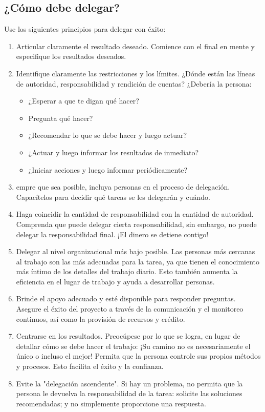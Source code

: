 \documentclass[10pt]{book}
\begin{document}
\subsection{¿Cómo debe delegar?}
Use los siguientes principios para delegar con éxito:
\begin{enumerate}[\bfseries 1.]
\item Articular claramente el resultado deseado. Comience con el final en mente y especifique los resultados deseados.
\item Identifique claramente las restricciones y los límites. ¿Dónde están las líneas de autoridad, responsabilidad y rendición de cuentas? ¿Debería la persona:
\begin{itemize}
\item ¿Esperar a que te digan qué hacer?
\item Pregunta qué hacer?
\item ¿Recomendar lo que se debe hacer y luego actuar?
\item ¿Actuar y luego informar los resultados de inmediato?
\item ¿Iniciar acciones y luego informar periódicamente?
\end{itemize}
\item empre que sea posible, incluya personas en el proceso de delegación. Capacítelos para decidir qué tareas se les delegarán y cuándo.
\item Haga coincidir la cantidad de responsabilidad con la cantidad de autoridad. Comprenda que puede delegar cierta responsabilidad, sin embargo, no puede delegar la responsabilidad final. ¡El dinero se detiene contigo!
\item Delegar al nivel organizacional más bajo posible. Las personas más cercanas al trabajo son las más adecuadas para la tarea, ya que tienen el conocimiento más íntimo de los detalles del trabajo diario. Esto también aumenta la eficiencia en el lugar de trabajo y ayuda a desarrollar personas.
\item Brinde el apoyo adecuado y esté disponible para responder preguntas. Asegure el éxito del proyecto a través de la comunicación y el monitoreo continuos, así como la provisión de recursos y crédito.
\item Centrarse en los resultados. Preocúpese por lo que se logra, en lugar de detallar cómo se debe hacer el trabajo: ¡Su camino no es necesariamente el único o incluso el mejor! Permita que la persona controle sus propios métodos y procesos. Esto facilita el éxito y la confianza.
\item Evite la "delegación ascendente". Si hay un problema, no permita que la persona le devuelva la responsabilidad de la tarea: solicite las soluciones recomendadas; y no simplemente proporcione una respuesta.

\end{enumerate}
\end{document}
